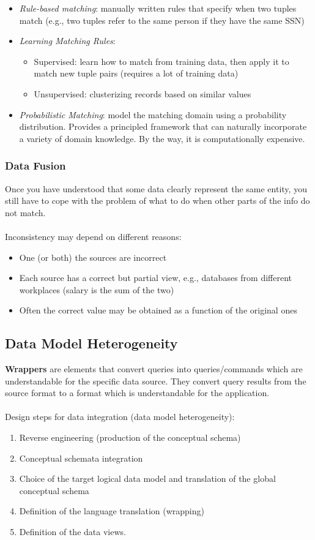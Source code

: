 \documentclass[10pt,a4paper]{article}
\newcommand{\nline}{\\~\\}
\begin{document}
\begin{itemize}
\begin{itemize}
		\item \textit{Rule-based matching}: manually written rules that specify when two tuples match (e.g., two tuples refer to the same person if they have the same SSN)
		\item \textit{Learning Matching Rules}: 
		\begin{itemize}
			\item Supervised: learn how to match from training data, then apply it to match new tuple pairs (requires a lot of training data)
			\item Unsupervised: clusterizing records based on similar values
		\end{itemize}
		\item \textit{Probabilistic Matching}: model the matching domain using a probability distribution. Provides a principled framework that can naturally incorporate a variety of domain knowledge. By the way, it is computationally expensive.
	\end{itemize}
\end{itemize}
\subsubsection{Data Fusion}
Once you have understood that some data clearly represent the same entity, you still have to cope with the problem of what to do when other parts of the info do not match. \nline
Inconsistency may depend on different reasons:
\begin{itemize}
	\item One (or both) the sources are incorrect
	\item Each source has a correct but partial view, e.g., databases from different workplaces (salary is the sum of the two)
	\item Often the correct value may be obtained as a function of the original ones
\end{itemize}
\subsection{Data Model Heterogeneity}
\textbf{Wrappers} are elements that convert queries into queries/commands which are understandable for the specific data source. They convert query results from the source format to a format which is understandable for the application.
 \nline
 Design steps for data integration (data model heterogeneity):
\begin{enumerate}
	\item Reverse engineering (production of the conceptual schema)
	\item Conceptual schemata integration
	\item Choice of the target logical data model and translation of the global conceptual schema 
	\item Definition of the language translation (wrapping)
	\item Definition of the data views.
\end{enumerate}
\pagebreak
\end{document}
